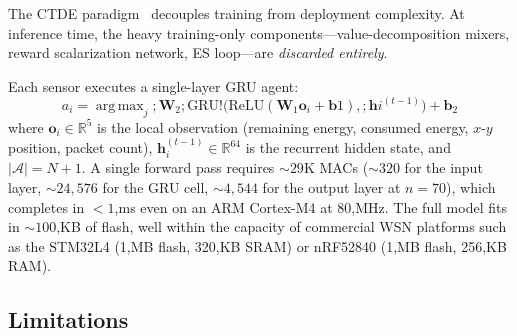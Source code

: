 \documentclass[12pt, onecolumn, journal]{IEEEtran}
\DeclareMathOperator*{\argmax}{arg\,max}
\begin{document}
The CTDE paradigm~\cite{kraemer2016multi,lowe2017multi} decouples training from deployment complexity. At inference time, the heavy training-only components---value-decomposition mixers, reward scalarization network, ES loop---are \emph{discarded entirely}.

\begin{center}
\label{tab:deployment_components}
\renewcommand{\arraystretch}{1.15}
\end{center}

Each sensor executes a single-layer GRU agent:
\begin{equation}
a_i = \argmax_{j}; \mathbf{W}_2 ;\mathrm{GRU}!\bigl(\mathrm{ReLU}(\mathbf{W}_1 \mathbf{o}_i + \mathbf{b}1),; \mathbf{h}{i}^{(t-1)}\bigr) + \mathbf{b}_2
\label{eq:agent_forward}
\end{equation}
where $\mathbf{o}_i \in \mathbb{R}^5$ is the local observation (remaining energy, consumed energy, $x$-$y$ position, packet count), $\mathbf{h}_i^{(t-1)} \in \mathbb{R}^{64}$ is the recurrent hidden state, and $|\mathcal{A}|{=}N{+}1$. A single forward pass requires ${\sim}29$K MACs (${\sim}320$ for the input layer, ${\sim}24{,}576$ for the GRU cell, ${\sim}4{,}544$ for the output layer at $n{=}70$), which completes in $<1$,ms even on an ARM Cortex-M4 at 80,MHz. The full model fits in ${\sim}100$,KB of flash, well within the capacity of commercial WSN platforms such as the STM32L4 (1,MB flash, 320,KB SRAM) or nRF52840 (1,MB flash, 256,KB RAM).

\subsection{Limitations}
\label{sec:limitations}
\end{document}
